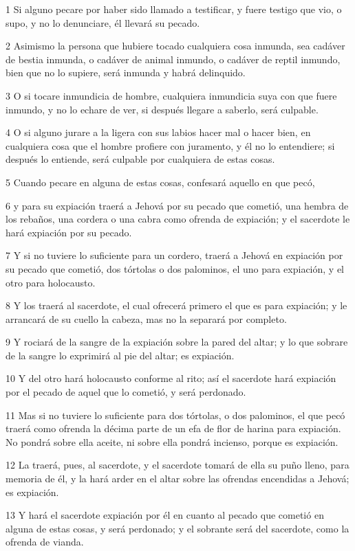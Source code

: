 \par 1 Si alguno pecare por haber sido llamado a testificar, y fuere testigo que vio, o supo, y no lo denunciare, él llevará su pecado.
\par 2 Asimismo la persona que hubiere tocado cualquiera cosa inmunda, sea cadáver de bestia inmunda, o cadáver de animal inmundo, o cadáver de reptil inmundo, bien que no lo supiere, será inmunda y habrá delinquido.
\par 3 O si tocare inmundicia de hombre, cualquiera inmundicia suya con que fuere inmundo, y no lo echare de ver, si después llegare a saberlo, será culpable.
\par 4 O si alguno jurare a la ligera con sus labios hacer mal o hacer bien, en cualquiera cosa que el hombre profiere con juramento, y él no lo entendiere; si después lo entiende, será culpable por cualquiera de estas cosas.
\par 5 Cuando pecare en alguna de estas cosas, confesará aquello en que pecó,
\par 6 y para su expiación traerá a Jehová por su pecado que cometió, una hembra de los rebaños, una cordera o una cabra como ofrenda de expiación; y el sacerdote le hará expiación por su pecado.
\par 7 Y si no tuviere lo suficiente para un cordero, traerá a Jehová en expiación por su pecado que cometió, dos tórtolas o dos palominos, el uno para expiación, y el otro para holocausto.
\par 8 Y los traerá al sacerdote, el cual ofrecerá primero el que es para expiación; y le arrancará de su cuello la cabeza, mas no la separará por completo.
\par 9 Y rociará de la sangre de la expiación sobre la pared del altar; y lo que sobrare de la sangre lo exprimirá al pie del altar; es expiación.
\par 10 Y del otro hará holocausto conforme al rito; así el sacerdote hará expiación por el pecado de aquel que lo cometió, y será perdonado.
\par 11 Mas si no tuviere lo suficiente para dos tórtolas, o dos palominos, el que pecó traerá como ofrenda la décima parte de un efa   de flor de harina para expiación. No pondrá sobre ella aceite, ni sobre ella pondrá incienso, porque es expiación.
\par 12 La traerá, pues, al sacerdote, y el sacerdote tomará de ella su puño lleno, para memoria de él, y la hará arder en el altar sobre las ofrendas encendidas a Jehová; es expiación.
\par 13 Y hará el sacerdote expiación por él en cuanto al pecado que cometió en alguna de estas cosas, y será perdonado; y el sobrante será del sacerdote, como la ofrenda de vianda.

